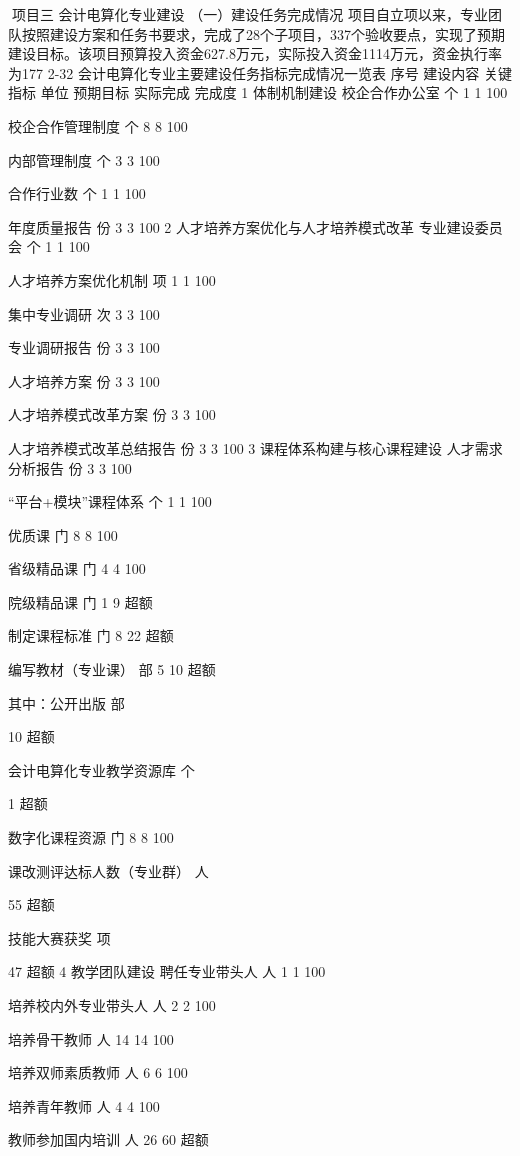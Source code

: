 项目三  会计电算化专业建设
（一）建设任务完成情况
项目自立项以来，专业团队按照建设方案和任务书要求，完成了28个子项目，337个验收要点，实现了预期建设目标。该项目预算投入资金627.8万元，实际投入资金1114万元，资金执行率为177%
2-32 会计电算化专业主要建设任务指标完成情况一览表
序号
建设内容
关键指标
单位
预期目标
实际完成
完成度
1
体制机制建设
校企合作办公室
个
1
1
100%


校企合作管理制度
个
8
8
100%


内部管理制度
个
3
3
100%


合作行业数
个
1
1
100%


年度质量报告
份
3
3
100%
2
人才培养方案优化与人才培养模式改革
专业建设委员会
个
1
1
100%


人才培养方案优化机制
项
1
1
100%


集中专业调研
次
3
3
100%


专业调研报告
份
3
3
100%


人才培养方案
份
3
3
100%


人才培养模式改革方案
份
3
3
100%


人才培养模式改革总结报告
份
3
3
100%
3
课程体系构建与核心课程建设
人才需求分析报告
份
3
3
100%


“平台+模块”课程体系
个
1
1
100%


优质课
门
8
8
100%


省级精品课
门
4
4
100%


院级精品课
门
1
9
超额


制定课程标准
门
8
22
超额


编写教材（专业课）
部
5
10
超额


    其中：公开出版
部

10
超额


会计电算化专业教学资源库
个

1
超额


数字化课程资源
门
8
8
100%


课改测评达标人数（专业群）
人

55
超额


技能大赛获奖
项

47
超额
4
教学团队建设
聘任专业带头人
人
1
1
100%


培养校内外专业带头人
人
2
2
100%


培养骨干教师
人
14
14
100%


培养双师素质教师
人
6
6
100%


培养青年教师
人
4
4
100%


教师参加国内培训
人
26
60
超额


